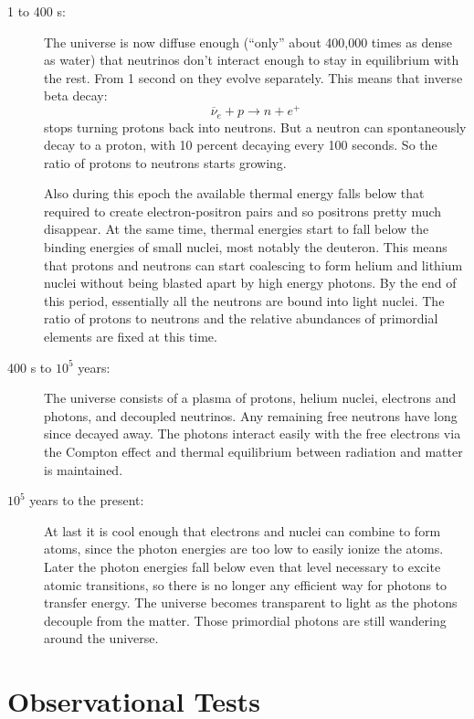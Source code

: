 \begin{description}
\item[1 to 400 s:] The universe is now diffuse enough (``only'' about
  400,000 times as dense as water) that neutrinos don't interact
  enough to stay in equilibrium with the rest.  From 1 second on they
  evolve separately.  This means that inverse beta decay:
  \begin{equation}
    \overline\nu_e + p \to n + e^+
  \end{equation}
  stops turning protons back into neutrons.  But a neutron can
  spontaneously decay to a proton, with 10 percent decaying every 100
  seconds.  So the ratio of protons to neutrons starts growing.

  Also during this epoch the available thermal energy falls below that
  required to create electron-positron pairs and so positrons pretty
  much disappear. At the same time, thermal energies start to fall
  below the binding energies of small nuclei, most notably the
  deuteron.  This means that protons and neutrons can start coalescing
  to form helium and lithium nuclei without being blasted apart by
  high energy photons. By the end of this period, essentially all the
  neutrons are bound into light nuclei. The ratio of protons to
  neutrons and the relative abundances of primordial elements are
  fixed at this time.

\item[400 s to $10^5$ years:] The universe consists of a plasma of
  protons, helium nuclei, electrons and photons, and decoupled
  neutrinos. Any remaining free neutrons have long since decayed away.
  The photons interact easily with the free electrons via the Compton
  effect and thermal equilibrium between radiation and matter is
  maintained.

\item[$10^5$ years to the present:] At last it is cool enough that
  electrons and nuclei can combine to form atoms, since the photon
  energies are too low to easily ionize the atoms.  Later the photon
  energies fall below even that level necessary to excite atomic
  transitions, so there is no longer any efficient way for photons to
  transfer energy.  The universe becomes transparent to light as the
  photons decouple from the matter. Those primordial photons are still
  wandering around the universe.
\end{description}


\section{Observational Tests}

